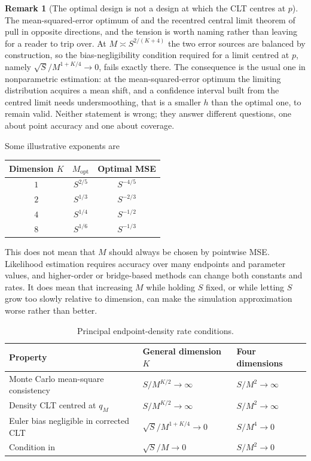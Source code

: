 \documentclass[11pt]{article}
\theoremstyle{definition}
\newtheorem{remark}[remark]{Remark}
\begin{document}
\begin{remark}[The optimal design is not a design at which the CLT centres at $p$]\label{rem:undersmoothing}
The mean-squared-error optimum of  and the recentred central limit theorem of  pull in opposite directions, and the tension is worth naming rather than leaving for a reader to trip over. At $M\asymp S^{2/(K+4)}$ the two error sources are balanced by construction, so the bias-negligibility condition required for a limit centred at $p$, namely $\sqrt S/M^{1+K/4}\to0$, fails exactly there. The consequence is the usual one in nonparametric estimation: at the mean-squared-error optimum the limiting distribution acquires a mean shift, and a confidence interval built from the centred limit needs undersmoothing, that is a smaller $h$ than the optimal one, to remain valid. Neither statement is wrong; they answer different questions, one about point accuracy and one about coverage.
\end{remark} Some illustrative exponents are
\begin{center}
\begin{tabular}{ccc}
\toprule
Dimension $K$ & $M_{\mathrm{opt}}$ & Optimal MSE \\
\midrule
$1$ & $S^{2/5}$ & $S^{-4/5}$ \\
$2$ & $S^{1/3}$ & $S^{-2/3}$ \\
$4$ & $S^{1/4}$ & $S^{-1/2}$ \\
$8$ & $S^{1/6}$ & $S^{-1/3}$ \\
\bottomrule
\end{tabular}
\end{center}

This does not mean that $M$ should always be chosen by pointwise MSE. Likelihood estimation requires accuracy over many endpoints and parameter values, and higher-order or bridge-based methods can change both constants and rates. It does mean that increasing $M$ while holding $S$ fixed, or while letting $S$ grow too slowly relative to dimension, can make the simulation approximation worse rather than better.

\begin{table}[htbp]
\centering
\caption{Principal endpoint-density rate conditions.}
\label{tab:rates}
\begin{tabular}{lll}
\toprule
Property & General dimension $K$ & Four dimensions \\
\midrule
Monte Carlo mean-square consistency
& $S/M^{K/2}\to\infty$ & $S/M^2\to\infty$ \\
Density CLT centred at $q_M$
& $S/M^{K/2}\to\infty$ & $S/M^2\to\infty$ \\
Euler bias negligible in corrected CLT
& $\sqrt S/M^{1+K/4}\to0$ & $S/M^4\to0$ \\
Condition in \citet{BrandtSantaClara2002}
& $\sqrt S/M\to0$ & $S/M^2\to0$ \\
\bottomrule
\end{tabular}
\end{table}
\end{document}
